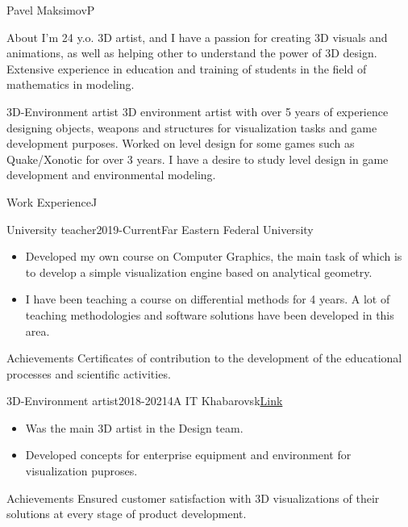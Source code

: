 \documentclass[10pt]{extarticle}
\begin{document}
	\begin{centralpart}{Pavel Maksimov}{P}{}
		\begin{titleblock}{About}{}{}{}
			I'm 24 y.o. 3D artist, and I have a passion for creating 3D visuals and animations, as well as helping other to understand the power of 3D design. Extensive experience in education and training of students in the field of mathematics in modeling.
		\end{titleblock}

		\begin{titleblock}{3D-Environment artist}{}{}{}
			3D environment artist with over 5 years of experience designing objects, weapons and structures for visualization tasks and game development purposes. Worked on level design for some games such as Quake/Xonotic for over 3 years. I have a desire to study level design in game development and environmental modeling.
		\end{titleblock}
	\end{centralpart}

	\setlength{\currentpos}{\getposy+5pt}
	
	\begin{centralpart}{Work Experience}{J}{}
		\begin{titleblock}{University teacher}{2019-Current}{Far Eastern Federal University}{}
			\begin{itemize}[label=$\circ$]
				\item Developed my own course on Computer Graphics, the main task of which is to develop a simple visualization engine based on analytical geometry.
				\item I have been teaching a course on differential methods for 4 years. A lot of teaching methodologies and software solutions have been developed in this area.
			\end{itemize}
		\end{titleblock}
		\begin{additionalblock}{Achievements}
			Certificates of contribution to the development of the educational processes and scientific activities.
		\end{additionalblock}
		\begin{titleblock}{3D-Environment artist}{2018-2021}{4A IT Khabarovsk}{\href{https://4ait.ru/}{Link}}
			\begin{itemize}[label=$\circ$]
				\item Was the main 3D artist in the Design team.
				\item Developed concepts for enterprise equipment and environment for visualization puproses.
			\end{itemize}
		\end{titleblock}
		\begin{additionalblock}{Achievements}
			Ensured customer satisfaction with 3D visualizations of their solutions at every stage of product development.
		\end{additionalblock}
	\end{centralpart}
\end{document}
